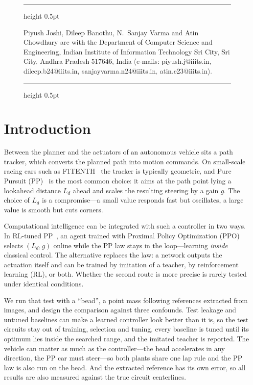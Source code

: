 \documentclass[10pt,twocolumn,twoside]{article}
\newcommand{\Ld}{L_d}
\begin{document}
\begin{figure}[b]
\hrule height 0.5pt
\vspace{6.5pt}
{\fontsize{8.5}{10}\selectfont\leftskip=3.6pt\rightskip=3.6pt\noindent
Piyush Joshi, Dileep Banothu, N.\ Sanjay Varma and Atin Chowdhury are with
the Department of Computer Science and Engineering, Indian Institute of
Information Technology Sri City, Sri City, Andhra Pradesh 517646, India
(e-mails: piyush.j@iiits.in, dileep.b24@iiits.in, sanjayvarma.n24@iiits.in,
atin.c23@iiits.in).\par}
\vspace{4.5pt}
\hrule height 0.5pt
\end{figure}

\section{Introduction}

Between the planner and the actuators of an autonomous vehicle sits a path
tracker, which converts the planned path into motion commands. On small-scale
racing cars such as F1TENTH~\cite{okelly2020f1tenth} the tracker is typically
geometric, and Pure Pursuit (PP)~\cite{coulter1992,snider2009} is the most
common choice: it aims at the path point lying a lookahead distance $\Ld$ ahead
and scales the resulting steering by a gain $g$. The choice of $\Ld$ is a
compromise---a small value responds fast but oscillates, a large value is
smooth but cuts corners.

Computational intelligence can be integrated with such a controller in two
ways. In RL-tuned PP~\cite{elgouhary2026}, an agent trained
with Proximal Policy Optimization (PPO)~\cite{schulman2017ppo} selects
$(\Ld,g)$ online while the PP law
stays in the loop---learning \emph{inside} classical control. The alternative
replaces the law: a network outputs the actuation itself and can be trained by
imitation of a teacher, by reinforcement learning (RL), or both. Whether the
second route is more precise is rarely tested under identical conditions.

We run that test with a ``bead'', a point mass following references
extracted from images, and design the comparison against three confounds. Test
leakage and untuned baselines can make a learned controller look better than it
is, so the test circuits stay out of training, selection and tuning, every
baseline is tuned until its optimum lies inside the searched range, and the
imitated teacher is reported. The vehicle can matter as much as the
controller---the bead accelerates in any direction, the PP car must steer---so
both plants share one lap rule and the PP law is also run on the bead. And the
extracted reference has its own error, so all results are also measured against
the true circuit centerlines.
\end{document}
